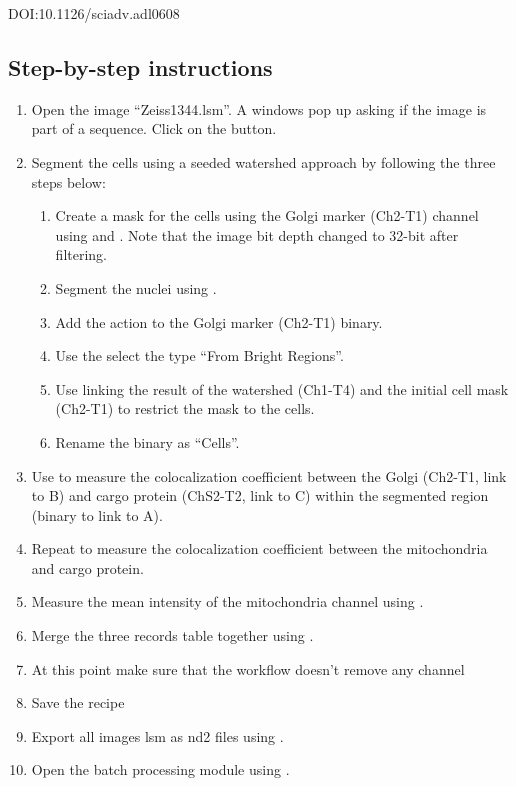 DOI:10.1126/sciadv.adl0608

\subsection{Step-by-step instructions}
\begin{enumerate}
    \item Open the image ``Zeiss1344.lsm''. A windows pop up asking if the image is part of a sequence. Click on the  button.
    \item Segment the cells using a seeded watershed approach by following the three steps below:
    \begin{enumerate}
        \item Create a mask for the cells using the Golgi marker (Ch2-T1) channel using  and  . Note that the image bit depth changed to 32-bit after filtering.
        \item Segment the nuclei using  .
        \item Add the action  to the Golgi marker (Ch2-T1) binary. 
        \item Use the  select the type ``From Bright Regions''. 
        \item Use  linking the result of the watershed (Ch1-T4) and the initial cell mask (Ch2-T1) to restrict the mask to the cells.
        \item Rename the binary as ``Cells''.
    \end{enumerate}
    \item Use  to measure the colocalization coefficient between the Golgi (Ch2-T1, link to B) and cargo protein (ChS2-T2, link to C) within the segmented region (binary to link to A). 
    \item Repeat to measure the colocalization coefficient between the mitochondria and cargo protein.
    \item Measure the mean intensity of the mitochondria channel using .
    \item Merge the three records table together using .
    \item At this point make sure that the workflow doesn't remove any channel
    \item Save the recipe
    \item Export all images lsm as nd2 files using .
    \item Open the batch processing module using .
\end{enumerate}
